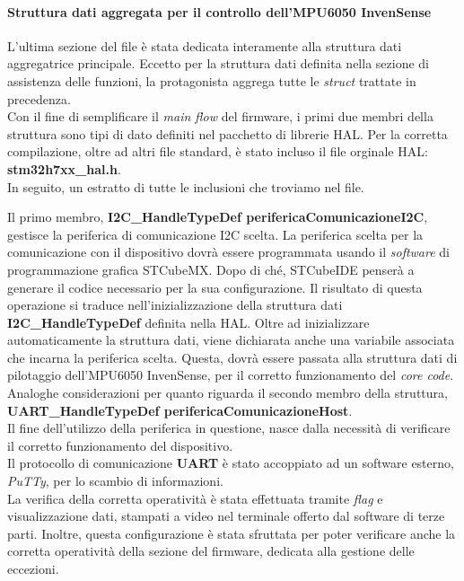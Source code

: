\documentclass[11pt]{report}
\begin{document}
\paragraph{Struttura dati aggregata per il controllo dell'MPU6050 InvenSense}
L'ultima sezione del file è stata dedicata interamente alla struttura dati aggregatrice principale. Eccetto per la struttura dati definita nella sezione di assistenza delle funzioni, la protagonista aggrega tutte le \textit{struct} trattate in precedenza.\\
Con il fine di semplificare il \textit{main flow} del firmware, i primi due membri della struttura sono tipi di dato definiti nel pacchetto di librerie HAL. Per la corretta compilazione, oltre ad altri file standard,  è stato incluso il file orginale HAL: \textbf{stm32h7xx\_hal.h}.\\
In seguito, un estratto di tutte le inclusioni che troviamo nel file.

Il primo membro, \textbf{I2C\_HandleTypeDef perifericaComunicazioneI2C}, gestisce la periferica di comunicazione I2C scelta. La periferica scelta per la comunicazione con il dispositivo dovrà essere programmata usando il \textit{software} di programmazione grafica STCubeMX.
Dopo di ché, STCubeIDE penserà a generare il codice necessario per la sua configurazione. Il risultato di questa operazione si traduce nell'inizializzazione della struttura dati \textbf{I2C\_HandleTypeDef} definita nella HAL. Oltre ad inizializzare automaticamente la struttura dati, viene dichiarata anche una variabile associata
che incarna la periferica scelta. Questa, dovrà essere passata alla struttura dati di pilotaggio dell'MPU6050 InvenSense, per il corretto funzionamento del \textit{core code}.
Analoghe considerazioni per quanto riguarda il secondo membro della struttura, \textbf{UART\_HandleTypeDef perifericaComunicazioneHost}. 
\\Il fine dell'utilizzo della periferica in questione, nasce dalla necessità di verificare il corretto funzionamento del dispositivo.\\
Il protocollo di comunicazione \textbf{UART} è stato accoppiato ad un software esterno, \textit{PuTTy}, per lo scambio di informazioni.\\
La verifica della corretta operatività è stata effettuata tramite \textit{flag} e visualizzazione dati, stampati a video nel terminale offerto dal software di terze parti. Inoltre, questa configurazione è stata sfruttata per poter verificare anche la corretta operatività della sezione del firmware, dedicata alla gestione delle eccezioni.\\
\end{document}
